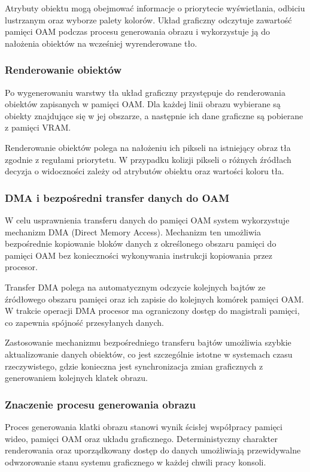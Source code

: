 \documentclass{article}
\begin{document}
Atrybuty obiektu mogą obejmować informacje o priorytecie wyświetlania, odbiciu lustrzanym oraz wyborze palety kolorów. Układ graficzny odczytuje zawartość pamięci OAM podczas procesu generowania obrazu i wykorzystuje ją do nałożenia obiektów na wcześniej wyrenderowane tło.

\subsubsection{Renderowanie obiektów}

Po wygenerowaniu warstwy tła układ graficzny przystępuje do renderowania obiektów zapisanych w pamięci OAM. Dla każdej linii obrazu wybierane są obiekty znajdujące się w jej obszarze, a następnie ich dane graficzne są pobierane z pamięci VRAM.

Renderowanie obiektów polega na nałożeniu ich pikseli na istniejący obraz tła zgodnie z regułami priorytetu. W przypadku kolizji pikseli o różnych źródłach decyzja o widoczności zależy od atrybutów obiektu oraz wartości koloru tła.

\subsubsection{DMA i bezpośredni transfer danych do OAM}

W celu usprawnienia transferu danych do pamięci OAM system wykorzystuje mechanizm DMA (Direct Memory Access). Mechanizm ten umożliwia bezpośrednie kopiowanie bloków danych z określonego obszaru pamięci do pamięci OAM bez konieczności wykonywania instrukcji kopiowania przez procesor.

Transfer DMA polega na automatycznym odczycie kolejnych bajtów ze źródłowego obszaru pamięci oraz ich zapisie do kolejnych komórek pamięci OAM. W trakcie operacji DMA procesor ma ograniczony dostęp do magistrali pamięci, co zapewnia spójność przesyłanych danych.

Zastosowanie mechanizmu bezpośredniego transferu bajtów umożliwia szybkie aktualizowanie danych obiektów, co jest szczególnie istotne w systemach czasu rzeczywistego, gdzie konieczna jest synchronizacja zmian graficznych z generowaniem kolejnych klatek obrazu.

\subsubsection{Znaczenie procesu generowania obrazu}

Proces generowania klatki obrazu stanowi wynik ścisłej współpracy pamięci wideo, pamięci OAM oraz układu graficznego. Deterministyczny charakter renderowania oraz uporządkowany dostęp do danych umożliwiają przewidywalne odwzorowanie stanu systemu graficznego w każdej chwili pracy konsoli.
\end{document}
